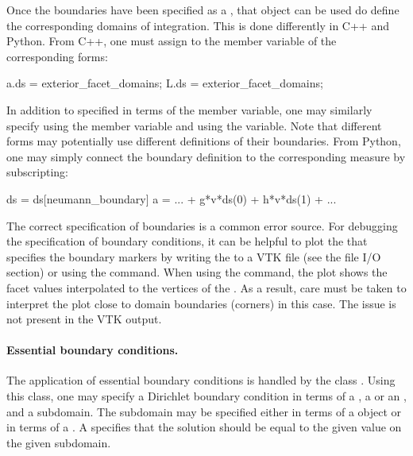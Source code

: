 Once the boundaries have been specified as a , that
object can be used do define the corresponding domains of
integration. This is done differently in C++ and Python. From C++, one
must assign to the  member variable of the corresponding
forms:
\begin{c++}
a.ds = exterior_facet_domains;
L.ds = exterior_facet_domains;
\end{c++}
In addition to  specified in terms of
the  member variable, one may similarly specify
 using the  member variable and
 using the  variable.  Note that
different forms may potentially use different definitions of their
boundaries. From Python, one may simply connect the boundary
definition to the corresponding measure by subscripting:
\begin{python}
ds = ds[neumann_boundary]
a = ... + g*v*ds(0) + h*v*ds(1) + ...
\end{python}

The correct specification of boundaries is a common error source. For
debugging the specification of boundary conditions, it can be helpful
to plot the  that specifies the boundary markers by
writing the  to a VTK file (see the file I/O
section) or using the  command. When using the 
command, the plot shows the facet values interpolated to the vertices
of the . As a result, care must be taken to interpret the
plot close to domain boundaries (corners) in this case. The issue is
not present in the VTK output.

\paragraph{Essential boundary conditions.}

The application of essential boundary conditions is handled by the
class . Using this class, one may specify a Dirichlet
boundary condition in terms of a , a 
or an , and a subdomain. The subdomain may be
specified either in terms of a  object or in terms of a
. A  specifies that the solution
should be equal to the given value on the given subdomain.

